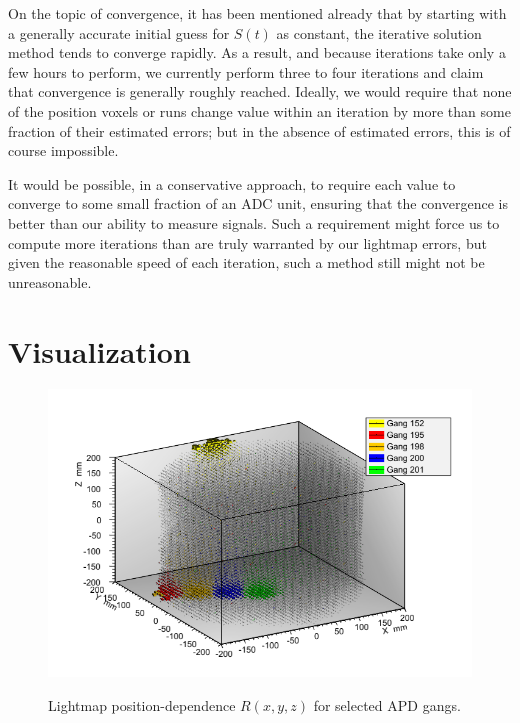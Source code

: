 On the topic of convergence, it has been mentioned already that by starting with a generally accurate initial guess for $S(t)$ as constant, the iterative solution method tends to converge rapidly.  As a result, and because iterations take only a few hours to perform, we currently perform three to four iterations and claim that convergence is generally roughly reached.  Ideally, we would require that none of the position voxels or runs change value within an iteration by more than some fraction of their estimated errors; but in the absence of estimated errors, this is of course impossible.

It would be possible, in a conservative approach, to require each value to converge to some small fraction of an ADC unit, ensuring that the convergence is better than our ability to measure signals.  Such a requirement might force us to compute more iterations than are truly warranted by our lightmap errors, but given the reasonable speed of each iteration, such a method still might not be unreasonable.  


\section{Visualization} \label{sec:LightmapVisualization}

\begin{figure}
\begin{center}
\includegraphics[keepaspectratio=true,width=\textwidth]{Lightmap_viz.png}
\end{center}
\renewcommand{\baselinestretch}{1}
\small\normalsize
\begin{quote}
\caption{Lightmap position-dependence $R(x,y,z)$ for selected APD gangs.}
\label{fig:Lightmap3DPlot_unzoomed}
\end{quote}
\end{figure}
\renewcommand{\baselinestretch}{2}
\small\normalsize

